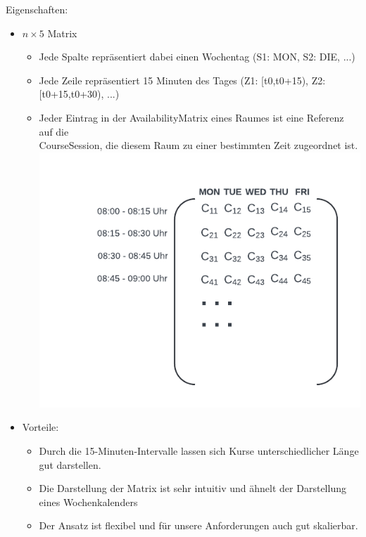 \documentclass{article}
\begin{document}
	
	Eigenschaften:
	\begin{itemize}
		\item $n \times 5$ Matrix
		\begin{itemize}
			\item Jede Spalte repräsentiert dabei einen Wochentag (S1: MON, S2: DIE, ...)
			\item Jede Zeile repräsentiert 15 Minuten des Tages (Z1: [t0,t0+15), Z2: [t0+15,t0+30), ...)
			\item Jeder Eintrag in der AvailabilityMatrix eines Raumes ist eine Referenz auf die\\ CourseSession, die diesem Raum zu einer bestimmten Zeit zugeordnet ist.\\
			\includegraphics{AvailabilityMatrix}
		\end{itemize}
		\item Vorteile:
		\begin{itemize}
			\item Durch die 15-Minuten-Intervalle lassen sich Kurse unterschiedlicher Länge gut darstellen.
			\item Die Darstellung der Matrix ist sehr intuitiv und ähnelt der Darstellung eines Wochenkalenders
			\item Der Ansatz ist flexibel und für unsere Anforderungen auch gut skalierbar.
		\end{itemize}
	\end{itemize}
\end{document}
